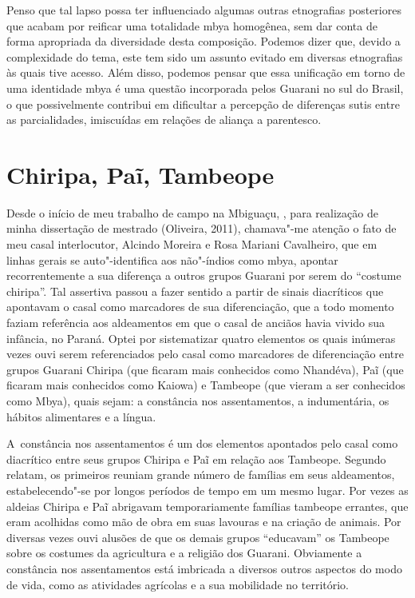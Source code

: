 Penso que tal lapso possa ter influenciado algumas outras etnografias
posteriores que acabam por reificar uma totalidade mbya homogênea, sem
dar conta de forma apropriada da diversidade desta composição. Podemos
dizer que, devido a complexidade do tema, este tem sido um assunto
evitado em diversas etnografias às quais tive acesso. Além disso,
podemos pensar que essa unificação em torno de uma identidade mbya é
uma questão incorporada pelos Guarani no sul do Brasil, o que
possivelmente contribui em dificultar a percepção de diferenças sutis
entre as parcialidades, imiscuídas em relações de aliança a parentesco.

\section{Chiripa, Paĩ, Tambeope}

Desde o início de meu trabalho de campo na  Mbiguaçu, , para
realização de minha dissertação de mestrado (Oliveira, 2011),
chamava"-me atenção o fato de meu casal interlocutor, Alcindo Moreira e
Rosa Mariani Cavalheiro, que em linhas gerais se auto"-identifica aos
não"-índios como mbya, apontar recorrentemente a sua diferença a outros
grupos Guarani por serem do ``costume chiripa''. Tal assertiva passou a
fazer sentido a partir de sinais diacríticos que apontavam o casal como
marcadores de sua diferenciação, que a todo momento faziam referência
aos aldeamentos em que o casal de anciãos havia vivido sua infância, no
Paraná. Optei por sistematizar quatro elementos os quais
inúmeras vezes ouvi serem referenciados pelo casal como marcadores de
diferenciação entre grupos Guarani Chiripa (que ficaram mais conhecidos
como Nhandéva), Paĩ (que ficaram mais conhecidos
como Kaiowa) e Tambeope (que vieram a ser conhecidos como Mbya), quais
sejam: a constância nos assentamentos, a indumentária, os hábitos
alimentares e a língua. 

A~constância nos assentamentos é um dos elementos apontados pelo casal
como diacrítico entre seus grupos Chiripa e Paĩ
em relação aos Tambeope. Segundo relatam, os primeiros reuniam grande
número de famílias em seus aldeamentos, estabelecendo"-se por longos
períodos de tempo em um mesmo lugar. Por vezes as aldeias Chiripa e
Paĩ abrigavam temporariamente famílias tambeope
errantes, que eram acolhidas como mão de obra em suas lavouras e na
criação de animais. Por diversas vezes ouvi alusões de que os demais
grupos ``educavam'' os Tambeope sobre os costumes da agricultura e a
religião dos Guarani. Obviamente a constância nos assentamentos está
imbricada a diversos outros aspectos do modo de vida, como as
atividades agrícolas e a sua mobilidade no território.


